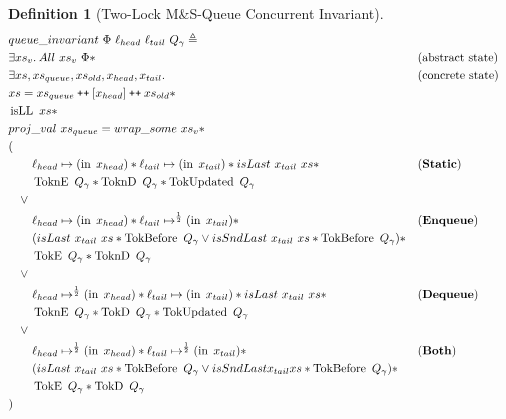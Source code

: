 \documentclass[twoside,11pt,openright]{report}
\newtheorem{definition}{Definition}[section]
\newcommand{\isLL}{\operatorname{isLL}}
\newcommand{\nIn}[1]{\operatorname{in} \; #1}
\newcommand{\StaticState}{\textbf{Static}}
\newcommand{\EnqueueState}{\textbf{Enqueue}}
\newcommand{\DequeueState}{\textbf{Dequeue}}
\newcommand{\BothState}{\textbf{Both}}
\newcommand{\Qg}{Q_\gname}
\newcommand{\TokE}[1]{\operatorname{TokE}\ #1}
\newcommand{\TokEQg}{\TokE{\Qg}}
\newcommand{\ToknE}[1]{\operatorname{ToknE}\ #1}
\newcommand{\ToknEQg}{\ToknE{\Qg}}
\newcommand{\TokD}[1]{\operatorname{TokD}\ #1}
\newcommand{\TokDQg}{\TokD{\Qg}}
\newcommand{\ToknD}[1]{\operatorname{ToknD}\ #1}
\newcommand{\ToknDQg}{\ToknD{\Qg}}
\newcommand{\TokBefore}[1]{\operatorname{TokBefore}\ #1}
\newcommand{\TokBeforeQg}{\TokBefore{\Qg}}
\newcommand{\TokAfterQg}{\TokBefore{\Qg}}
\newcommand{\TokUpdated}[1]{\operatorname{TokUpdated}\ #1}
\newcommand{\TokUpdatedQg}{\TokUpdated{\Qg}}
\newcommand\catenate{\mathbin{\text{\ttfamily\upshape ++}}}
\begin{document}
\begin{definition}[Two-Lock M\&S-Queue Concurrent Invariant]\label{TLMSQ:spec:invariant}
  \begin{align*}
    &queue\_invariant \ \Phi \ \loc_{head} \ \loc_{tail} \ Q_\gname \eqdef\\
    &\Exists xs_v. All \ xs_v \ \Phi \star &&\text{(abstract state)}\\
    &\Exists xs, xs_{queue}, xs_{old}, x_{head}, x_{tail} . &&\text{(concrete state)}\\
    &xs = xs_{queue} \catenate [x_{head}] \catenate xs_{old} \star\\
    &\isLL \ xs \star\\
    &proj\_val \ xs_{queue} = wrap\_some \ xs_v \star\\
    &(\\
    &\quad\quad\loc_{head} \mapsto (\nIn{x_{head}}) \star \loc_{tail} \mapsto (\nIn{x_{tail}}) \star isLast \ x_{tail} \ xs \star &&\text{(\StaticState)}\\
    &\quad\quad \ToknEQg \star \ToknDQg \star \TokUpdatedQg\\
    &\quad\lor\\
    &\quad\quad\loc_{head} \mapsto (\nIn{x_{head}}) \star \loc_{tail} \mapsto^{\frac{1}{2}} (\nIn{x_{tail}}) \star &&\text{(\EnqueueState)}\\
    &\quad\quad (isLast \ x_{tail} \ xs \star \TokBeforeQg \lor isSndLast \ x_{tail} \ xs \star \TokAfterQg) \star\\
    &\quad\quad \TokEQg \star \ToknDQg\\
    &\quad\lor\\
    &\quad\quad\loc_{head} \mapsto^{\frac{1}{2}} (\nIn{x_{head}}) \star \loc_{tail} \mapsto (\nIn{x_{tail}}) \star isLast \ x_{tail} \ xs \star &&\text{(\DequeueState)}\\
    &\quad\quad \ToknEQg \star \TokDQg \star \TokUpdatedQg\\
    &\quad\lor\\
    &\quad\quad\loc_{head} \mapsto^{\frac{1}{2}} (\nIn{x_{head}}) \star \loc_{tail} \mapsto^{\frac{1}{2}} (\nIn{x_{tail}}) \star &&\text{(\BothState)}\\
    &\quad\quad (isLast \ x_{tail} \ xs \star \TokBeforeQg \lor isSndLast x_{tail} xs \star \TokAfterQg) \star\\
    &\quad\quad \TokEQg \star \TokDQg\\
    &)
  \end{align*}
\end{definition}
\end{document}

